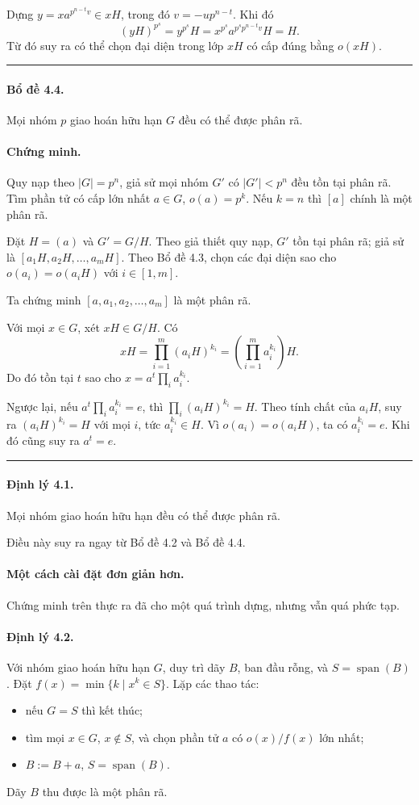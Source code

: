 \documentclass[11pt]{article}
\begin{document}
Dựng $y=xa^{p^{n-t}v}\in xH$, trong đó $v=-u p^{n-t}$. Khi đó
\[
  (yH)^{p^s}=y^{p^s}H=x^{p^s}a^{p^s p^{n-t}v}H=H.
\]
Từ đó suy ra có thể chọn đại diện trong lớp $xH$ có cấp đúng bằng $o(xH)$.
\hfill\rule{0.55em}{0.55em}

\paragraph{Bổ đề 4.4.}
Mọi nhóm $p$ giao hoán hữu hạn $G$ đều có thể được phân rã.

\paragraph{Chứng minh.}
Quy nạp theo $|G|=p^n$, giả sử mọi nhóm $G'$ có $|G'|<p^n$ đều tồn tại phân rã.
Tìm phần tử có cấp lớn nhất $a\in G$, $o(a)=p^k$. Nếu $k=n$ thì $[a]$ chính là
một phân rã.

Đặt $H=(a)$ và $G'=G/H$. Theo giả thiết quy nạp, $G'$ tồn tại phân rã; giả sử
là $[a_1H,a_2H,\ldots,a_mH]$. Theo Bổ đề 4.3, chọn các đại diện sao cho
$o(a_i)=o(a_iH)$ với $i\in[1,m]$.

Ta chứng minh $[a,a_1,a_2,\ldots,a_m]$ là một phân rã.

Với mọi $x\in G$, xét $xH\in G/H$. Có
\[
  xH=\prod_{i=1}^{m}(a_iH)^{k_i}
  =\left(\prod_{i=1}^{m}a_i^{k_i}\right)H.
\]
Do đó tồn tại $t$ sao cho $x=a^t\prod_i a_i^{k_i}$.

Ngược lại, nếu $a^t\prod_i a_i^{k_i}=e$, thì
$\prod_i(a_iH)^{k_i}=H$. Theo tính chất của $a_iH$, suy ra
$(a_iH)^{k_i}=H$ với mọi $i$, tức $a_i^{k_i}\in H$. Vì
$o(a_i)=o(a_iH)$, ta có $a_i^{k_i}=e$. Khi đó cũng suy ra $a^t=e$.
\hfill\rule{0.55em}{0.55em}

\paragraph{Định lý 4.1.}
Mọi nhóm giao hoán hữu hạn đều có thể được phân rã.

Điều này suy ra ngay từ Bổ đề 4.2 và Bổ đề 4.4.

\paragraph{Một cách cài đặt đơn giản hơn.}

Chứng minh trên thực ra đã cho một quá trình dựng, nhưng vẫn quá phức tạp.

\paragraph{Định lý 4.2.}
Với nhóm giao hoán hữu hạn $G$, duy trì dãy $B$, ban đầu rỗng, và
$S=\operatorname{span}(B)$. Đặt $f(x)=\min\{k\mid x^k\in S\}$. Lặp các thao tác:
\begin{itemize}
  \item nếu $G=S$ thì kết thúc;
  \item tìm mọi $x\in G$, $x\notin S$, và chọn phần tử $a$ có $o(x)/f(x)$ lớn
  nhất;
  \item $B:=B+a$, $S=\operatorname{span}(B)$.
\end{itemize}
Dãy $B$ thu được là một phân rã.
\end{document}
